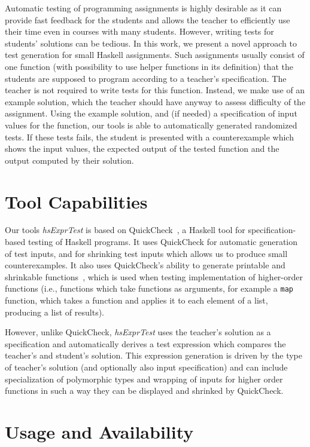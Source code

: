 \documentclass[sigconf,screen]{acmart} %
\newcommand{\hsExprTest}{\textit{hsExprTest}}
\begin{document}
Automatic testing of programming assignments is highly desirable as it can
provide fast feedback for the students and allows the teacher to efficiently
use their time even in courses with many students.
However, writing tests for students' solutions can be tedious.
In this work, we present a novel approach to test generation for small Haskell
assignments.
Such assignments usually consist of one function (with possibility to use
helper functions in its definition) that the students are supposed to program
according to a teacher's specification.
The teacher is not required to write tests for this function.
Instead, we make use of an example solution, which the teacher should have
anyway to assess difficulty of the assignment.
Using the example solution, and (if needed) a specification of input values for
the function, our tools is able to automatically generated randomized tests.
If these tests fails, the student is presented with a counterexample which
shows the input values, the expected output of the tested function and the
output computed by their solution.

\section{Tool Capabilities}

Our tools \hsExprTest{} is based on QuickCheck~\cite{Koen2000}, a Haskell tool for
specification-based testing of Haskell programs.
It uses QuickCheck for automatic generation of test inputs, and for shrinking
test inputs which allows us to produce small counterexamples.
It also uses QuickCheck's ability to generate printable and shrinkable
functions~\cite{Koen2012}, which is used when testing implementation of
higher-order functions (i.e., functions which take functions as arguments, for
example a \texttt{map} function, which takes a function and applies it to each
element of a list, producing a list of results).

However, unlike QuickCheck, \hsExprTest{} uses the teacher's solution as a
specification and automatically derives a test expression which compares the
teacher's and student's solution.
This expression generation is driven by the type of teacher's solution (and
optionally also input specification) and can include specialization of
polymorphic types and wrapping of inputs for higher order functions in such a
way they can be displayed and shrinked by QuickCheck.

\section{Usage and Availability}
\end{document}
